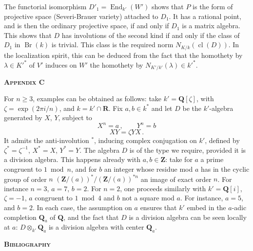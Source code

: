 \documentclass[12pt,a4paper]{article}
\theoremstyle{plain}
\theoremstyle{remark}
\DeclareMathOperator{\End}{End}
\DeclareMathOperator{\Br}{Br}
\DeclareMathOperator{\cl}{cl}
\begin{document}
The functorial isomorphism $D'_1 = \End_{k'}(W')$ shows that $P$ is the form of
projective space (Severi-Brauer variety) attached to $D_1$. It has a rational point,
and is then the ordinary projective space, if and only if $D_1$ is a matrix algebra.
This shows that $D$ has involutions of the second kind if and only if the class
of $D_1$ in $\Br(k)$ is trivial. This class is the required norm $N_{K/k}(\cl(D))$. In the
localization spirit, this can be deduced from the fact that the homothety by
$\lambda \in K'^*$ of $V'$ induces on $W'$ the homothety by $N_{K'/k'}(\lambda) \in k'^*$.

\vspace{0.5cm}
\begin{center}
\textbf{\textsc{Appendix C}}
\end{center}
\vspace{0.3cm}

For $n \geq 3$, examples can be obtained as follows: take $k' = \mathbf{Q}[\zeta]$, with
$\zeta = \exp(2\pi i/n)$, and $k = k' \cap \mathbf{R}$. Fix $a, b \in k^*$ and let $D$ be the $k'$-algebra
generated by $X$, $Y$, subject to
\[
X^n = a\,, \qquad Y^n = b
\]
\[
XY = \zeta YX\,.
\]
It admits the anti-involution ${}^*$, inducing complex conjugation on $k'$, defined
by $\zeta^* = \zeta^{-1}$, $X^* = X$, $Y^* = Y$. The algebra $D$ is of the type we require,
provided it is a division algebra. This happens already with $a, b \in \mathbf{Z}$: take
for $a$ a prime congruent to $1 \bmod n$, and for $b$ an integer whose residue mod $a$
has in the cyclic group of order $n$ $(\mathbf{Z}/(a))^*/(\mathbf{Z}/(a))^{*n}$ an image of exact order $n$.
For instance $n=3$, $a=7$, $b=2$. For $n=2$, one proceeds similarly with
$k' = \mathbf{Q}[i]$, $\zeta = -1$, $a$ congruent to $1 \bmod 4$ and $b$ not a square mod $a$. For
instance, $a=5$, and $b=2$. In each case, the assumption on $a$ ensures that $k'$
embed in the $a$-adic completion $\mathbf{Q}_a$ of $\mathbf{Q}$, and the fact that $D$ is a division
algebra can be seen locally at $a$: $D \otimes_{k'} \mathbf{Q}_a$ is a division algebra with center $\mathbf{Q}_a$.

\vspace{0.5cm}
\begin{center}
\textbf{\textsc{Bibliography}}
\end{center}
\vspace{0.3cm}
\end{document}

